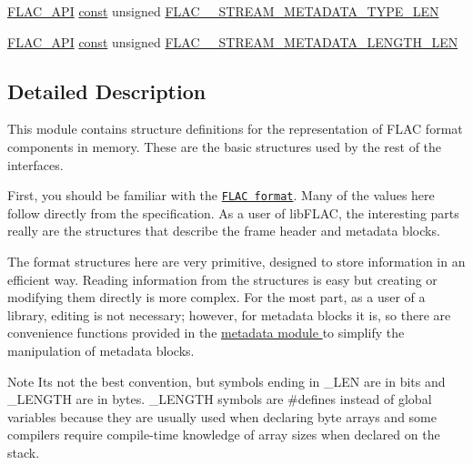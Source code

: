 \begin{DoxyCompactItemize}
\item 
\hyperlink{group__flac__export_ga56ca07df8a23310707732b1c0007d6f5}{F\+L\+A\+C\+\_\+\+A\+PI} \hyperlink{zconf_8h_a2c212835823e3c54a8ab6d95c652660e}{const} unsigned \hyperlink{group__flac__format_ga3804c687f8aef9c26369a63dd0a6b55c}{F\+L\+A\+C\+\_\+\+\_\+\+S\+T\+R\+E\+A\+M\+\_\+\+M\+E\+T\+A\+D\+A\+T\+A\+\_\+\+T\+Y\+P\+E\+\_\+\+L\+EN}
\item 
\hyperlink{group__flac__export_ga56ca07df8a23310707732b1c0007d6f5}{F\+L\+A\+C\+\_\+\+A\+PI} \hyperlink{zconf_8h_a2c212835823e3c54a8ab6d95c652660e}{const} unsigned \hyperlink{group__flac__format_ga4e565861db32c57c2f6bc71e9f1207a9}{F\+L\+A\+C\+\_\+\+\_\+\+S\+T\+R\+E\+A\+M\+\_\+\+M\+E\+T\+A\+D\+A\+T\+A\+\_\+\+L\+E\+N\+G\+T\+H\+\_\+\+L\+EN}
\end{DoxyCompactItemize}


\subsection{Detailed Description}
This module contains structure definitions for the representation of F\+L\+AC format components in memory. These are the basic structures used by the rest of the interfaces. 

First, you should be familiar with the \href{../format.html}{\tt F\+L\+AC format}. Many of the values here follow directly from the specification. As a user of lib\+F\+L\+AC, the interesting parts really are the structures that describe the frame header and metadata blocks.

The format structures here are very primitive, designed to store information in an efficient way. Reading information from the structures is easy but creating or modifying them directly is more complex. For the most part, as a user of a library, editing is not necessary; however, for metadata blocks it is, so there are convenience functions provided in the \hyperlink{group__flac__metadata}{metadata module } to simplify the manipulation of metadata blocks.

\begin{DoxyNote}{Note}
It\textquotesingle{}s not the best convention, but symbols ending in \+\_\+\+L\+EN are in bits and \+\_\+\+L\+E\+N\+G\+TH are in bytes. \+\_\+\+L\+E\+N\+G\+TH symbols are \#defines instead of global variables because they are usually used when declaring byte arrays and some compilers require compile-\/time knowledge of array sizes when declared on the stack. 
\end{DoxyNote}


